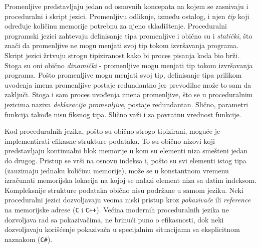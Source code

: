 Promenljive predstavljaju jedan od osnovnih koncepata na kojem se zasnivaju i proceduralni i skript jezici. Promenljivu odlikuje, između ostalog, i njen \emph{tip} koji određuje količinu memorije potrebnu za njeno skladištenje. Proceduralni programski jezici zahtevaju definisanje tipa promenljive i obično su i \emph{statički}, što znači da promenljive ne mogu menjati svoj tip tokom izvršavanja programa. Skript jezici žrtvuju strogu tipiziranost kako bi proces pisanja koda bio brži. Stoga su oni obično \emph{dinamički} - promenljive mogu menjati tip tokom izvršavanja programa. Pošto promenljive mogu menjati svoj tip, definisanje tipa prilikom uvođenja imena promenljive postaje redundantno jer prevodilac može to sam da zaključi. Stoga i sam proces uvođenja imena promenljive, što se u proceduralnim jezicima naziva \emph{deklaracija promenljive}, postaje redundantan. Slično, parametri funkcija takođe nisu fiksnog tipa. Slično važi i za povratnu vrednost funkcije.

Kod proceduralnih jezika, pošto su obično strogo tipizirani, moguće je implementirati efikasne strukture podataka. To su obično nizovi koji predstavljaju kontinualni blok memorije u kom su elementi niza smešteni jedan do drugog. Pristup se vrši na osnovu indeksa i, pošto su svi elementi istog tipa (zauzimaju jednaku količinu memorije), može se u konstantnom vremenu izračunati memorijska lokacija na kojoj se nalazi element niza sa datim indeksom. Kompleksnije strukture podataka obično nisu podržane u samom jeziku. Neki proceduralni jezici dozvoljavaju veoma niski pristup kroz \emph{pokazivače} ili \emph{reference} na memorijske adrese (\texttt{C} i \texttt{C++}). Većina modernih proceduralnih jezika ne dozvoljava rad sa pokazivačima, ne brinući puno o efikasnosti, dok neki dozvoljavaju korišćenje pokazivača u specijalnim situacijama sa eksplicitnom naznakom (\texttt{C\#}).

